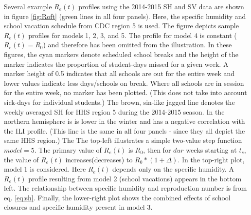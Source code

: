 \documentclass[a4paper]{article}
\begin{document}
Several example $R_e(t)$ profiles using the 2014-2015 SH and SV data are shown in figure \ref{fig:Roft} (green lines in all four panels).  Here, the specific humidity and school vacation schedule from CDC region 5 is used.  The figure depicts sample $R_e(t)$ profiles for models 1, 2, 3, and 5.  The profile for model 4 is constant ($R_e(t)=R_{0}$) and therefore has been omitted from the illustration.  In these figures, the cyan markers denote scheduled school breaks and the height of the marker indicates the proportion of student-days missed for a given week.  A marker height of 0.5 indicates that all schools are out for the entire week and lower values indicate less days/schools on break.  Where all schools are in session for the entire week, no marker has been plotted.  (This does not take into account sick-days for individual students.)  The brown, sin-like jagged line denotes the weekly averaged SH for HHS region 5 during the 2014-2015 season.  In the northern hemisphere is is lower in the winter and has a negative correlation with the ILI profile.  (This line is the same in all four panels - since they all depict the same HHS region.) The   The top-left illustrates a simple two-value step function $model = 5$.  The primary value of $R_e(t)$ is $R_{0}$, then for $dur$ weeks starting at $t_s$, the value of $R_e(t)$ increases(decreases) to $R_{0}*(1+\Delta)$.  In the top-right plot, model 1 is considered. Here $R_e(t)$ depends only on the specific humidity.  A $R_e(t)$ profile resulting from model 2 (school vacations) appears in the bottom left.  The relationship between specific humidity and reproduction number is from eq. \eqref{eq:sh}.  Finally, the lower-right plot shows the combined effects of school closures and specific humidity present in model 3.
\end{document}
